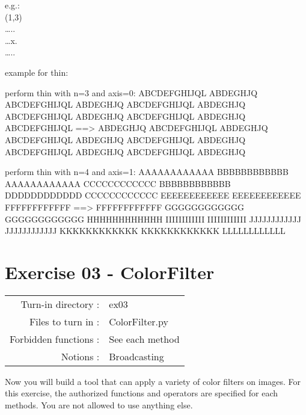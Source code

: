 \documentclass[]{article}
\newenvironment{Shaded}{\begin{snugshade}}{\end{snugshade}}
\newcommand{\NormalTok}[1]{\textcolor[rgb]{0.81,0.81,0.76}{#1}}
\begin{document}
e.g.:\\
(1,3)\\
\ldots{}..\\
\ldots{}x.\\
\ldots{}..

example for thin:

\begin{Shaded}
\begin{Highlighting}[]
\NormalTok{perform thin with n=3 and axis=0:}
\NormalTok{ABCDEFGHIJQL        ABDEGHJQ}
\NormalTok{ABCDEFGHIJQL        ABDEGHJQ}
\NormalTok{ABCDEFGHIJQL        ABDEGHJQ}
\NormalTok{ABCDEFGHIJQL        ABDEGHJQ}
\NormalTok{ABCDEFGHIJQL        ABDEGHJQ}
\NormalTok{ABCDEFGHIJQL  ==>   ABDEGHJQ}
\NormalTok{ABCDEFGHIJQL        ABDEGHJQ}
\NormalTok{ABCDEFGHIJQL        ABDEGHJQ}
\NormalTok{ABCDEFGHIJQL        ABDEGHJQ}
\NormalTok{ABCDEFGHIJQL        ABDEGHJQ}
\NormalTok{ABCDEFGHIJQL        ABDEGHJQ}

\NormalTok{perform thin with n=4 and axis=1:}
\NormalTok{AAAAAAAAAAAA        }
\NormalTok{BBBBBBBBBBBB        AAAAAAAAAAAA}
\NormalTok{CCCCCCCCCCCC        BBBBBBBBBBBB}
\NormalTok{DDDDDDDDDDDD        CCCCCCCCCCCC}
\NormalTok{EEEEEEEEEEEE        EEEEEEEEEEEE}
\NormalTok{FFFFFFFFFFFF  ==>   FFFFFFFFFFFF}
\NormalTok{GGGGGGGGGGGG        GGGGGGGGGGGG}
\NormalTok{HHHHHHHHHHHH        IIIIIIIIIIII}
\NormalTok{IIIIIIIIIIII        JJJJJJJJJJJJ}
\NormalTok{JJJJJJJJJJJJ        KKKKKKKKKKKK}
\NormalTok{KKKKKKKKKKKK        }
\NormalTok{LLLLLLLLLLLL        }
\end{Highlighting}
\end{Shaded}

\clearpage

\hypertarget{exercise-03---colorfilter-1}{%
\section{Exercise 03 - ColorFilter}\label{exercise-03---colorfilter-1}}

\begin{longtable}[]{@{}rl@{}}
\toprule
\endhead
Turn-in directory : & ex03\tabularnewline
Files to turn in : & ColorFilter.py\tabularnewline
Forbidden functions : & See each method\tabularnewline
Notions : & Broadcasting\tabularnewline
\bottomrule
\end{longtable}

Now you will build a tool that can apply a variety of color filters on
images. For this exercise, the authorized functions and operators are
specified for each methods. You are not allowed to use anything else.
\end{document}
